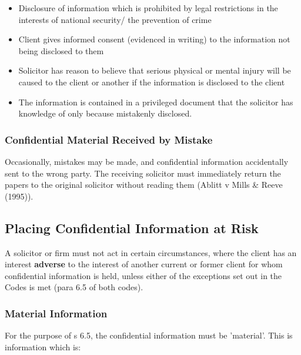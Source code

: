 \documentclass[
]{article}
\providecommand{\tightlist}{%
  \setlength{\itemsep}{0pt}\setlength{\parskip}{0pt}}
\begin{document}
\begin{itemize}
\tightlist
\item
  Disclosure of information which is prohibited by legal restrictions in
  the interests of national security/ the prevention of crime
\item
  Client gives informed consent (evidenced in writing) to the
  information not being disclosed to them
\item
  Solicitor has reason to believe that serious physical or mental injury
  will be caused to the client or another if the information is
  disclosed to the client
\item
  The information is contained in a privileged document that the
  solicitor has knowledge of only because mistakenly disclosed.
\end{itemize}

\hypertarget{confidential-material-received-by-mistake}{%
\subsubsection{Confidential Material Received by
Mistake}\label{confidential-material-received-by-mistake}}

Occasionally, mistakes may be made, and confidential information
accidentally sent to the wrong party. The receiving solicitor must
immediately return the papers to the original solicitor without reading
them (Ablitt v Mills \& Reeve (1995)).

\hypertarget{placing-confidential-information-at-risk}{%
\subsection{Placing Confidential Information at
Risk}\label{placing-confidential-information-at-risk}}

A solicitor or firm must not act in certain circumstances, where the
client has an interest \textbf{adverse} to the interest of another
current or former client for whom confidential information is held,
unless either of the exceptions set out in the Codes is met (para 6.5 of
both codes).

\hypertarget{material-information}{%
\subsubsection{Material Information}\label{material-information}}

For the purpose of s 6.5, the confidential information must be
'material'. This is information which is:
\end{document}
